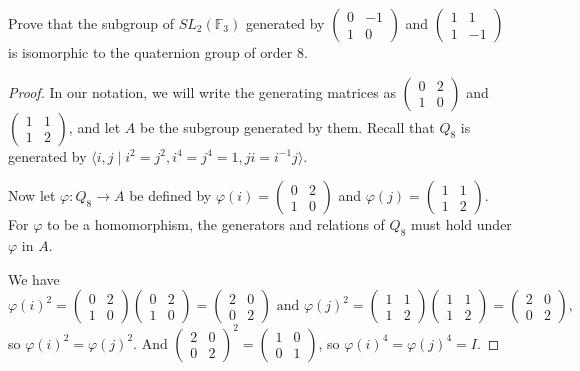 \documentclass{article}
\begin{document}
Prove that the subgroup of $SL_2(\mathbb{F}_3)$ generated by $\begin{pmatrix}0 & -1 \\ 1 & 0\end{pmatrix}$ and $\begin{pmatrix}1 & 1 \\ 1 & -1\end{pmatrix}$ is isomorphic to the quaternion group of order 8.

\begin{proof}
    In our notation, we will write the generating matrices as $\begin{pmatrix}0 & 2 \\ 1 & 0\end{pmatrix}$ and $\begin{pmatrix}1 & 1 \\ 1 & 2\end{pmatrix}$, and let $A$ be the subgroup generated by them. Recall that $Q_8$ is generated by $\langle i, j \mid i^2 = j^2, i^4 = j^4 = 1, ji = i^{-1}j \rangle$.

    Now let $\varphi: Q_8 \rightarrow A$ be defined by $\varphi(i) = \begin{pmatrix}0 & 2 \\ 1 & 0\end{pmatrix}$ and $\varphi(j) = \begin{pmatrix}1 & 1 \\ 1 & 2\end{pmatrix}$. For $\varphi$ to be a homomorphism, the generators and relations of $Q_8$ must hold under $\varphi$ in $A$.

    We have
    \begin{equation*}
        \varphi(i)^2 = \begin{pmatrix}0 & 2 \\ 1 & 0\end{pmatrix}\begin{pmatrix}0 & 2 \\ 1 & 0\end{pmatrix} = \begin{pmatrix}2 & 0 \\ 0 & 2\end{pmatrix} \text{ and } \varphi(j)^2 = \begin{pmatrix}1 & 1 \\ 1 & 2\end{pmatrix}\begin{pmatrix}1 & 1 \\ 1 & 2\end{pmatrix} = \begin{pmatrix}2 & 0 \\ 0 & 2\end{pmatrix},
    \end{equation*}
    so $\varphi(i)^2 = \varphi(j)^2$. And $\begin{pmatrix}2 & 0 \\ 0 & 2\end{pmatrix}^2 = \begin{pmatrix}1 & 0 \\ 0 & 1\end{pmatrix}$, so $\varphi(i)^4 = \varphi(j)^4 = I$.


\end{proof}
\end{document}
